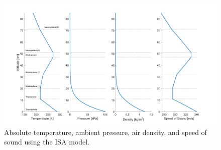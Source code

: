 \documentclass[../Thesis.tex]{subfiles}
\begin{document}
\begin{figure}
        \centering
    \includegraphics[width=\linewidth]{Figures/atmosphericparameters.png}
    \caption{Absolute temperature, ambient pressure, air density, and speed of sound using the ISA model.}
    \label{fig:atmos}
\end{figure}
\end{document}
